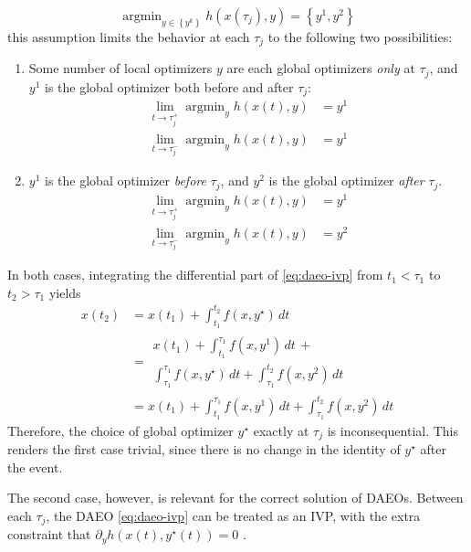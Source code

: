 \documentclass[twoside,leqno, twocolumn]{article}
\DeclareMathOperator*{\argmin}{\arg\min}
\begin{document}
\begin{equation*}
	\argmin_{y\in\left\{y^k\right\}} h(x(\tau_j), y) = \left\{y^1, y^2\right\}
\end{equation*}
this assumption limits the behavior at each $\tau_j$ to the following two possibilities:
\begin{enumerate}
	\item Some number of local optimizers $y$ are each global optimizers \textit{only} at $\tau_j$, and $y^1$ is the global optimizer both before and after $\tau_j$:
	\begin{equation*}
		\begin{aligned}
			\lim_{t\to \tau_j^+} \argmin_{y} h(x(t), y) &= y^1\\
			\lim_{t\to \tau_j^-} \argmin_{y} h(x(t), y) &= y^1
		\end{aligned}
	\end{equation*}
	\item $y^1$ is the global optimizer \textit{before} $\tau_j$, and $y^2$ is the global optimizer \textit{after} $\tau_j$.
	\begin{equation*}
		\begin{aligned}
			\lim_{t\to \tau_j^+} \argmin_{y} h(x(t), y) &= y^1\\
			\lim_{t\to \tau_j^-} \argmin_{y} h(x(t), y) &= y^2
		\end{aligned}
	\end{equation*}
\end{enumerate}
In both cases, integrating the differential part of \eqref{eq:daeo-ivp} from $t_1 < \tau_1$ to $t_2 > \tau_1$ yields
\begin{equation}
	\begin{aligned}
		x(t_2) &= x(t_1) + \int_{t_1}^{t_2}f(x, y^\star)\,dt\\
		&=\begin{split}
			x(t_1) + \int_{t_1}^{\tau_1}f(x, y^1)\,dt\,+\\
			\int_{\tau_1}^{\tau_1}f(x, y^\star)\,dt +\int_{\tau_1}^{t_2}f(x, y^2)\,dt
		\end{split}\\
		&=x(t_1) + \int_{t_1}^{\tau_1}f(x, y^1)\,dt + \int_{\tau_1}^{t_2}f(x, y^2)\,dt
	\end{aligned}
\end{equation}
Therefore, the choice of global optimizer $y^\star$ exactly at $\tau_j$ is inconsequential. This renders the first case trivial, since there is no change in the identity of $y^\star$ after the event.

The second case, however, is relevant for the correct solution of DAEOs. Between each $\tau_j$, the DAEO \eqref{eq:daeo-ivp} can be treated as an IVP, with the extra constraint that $\partial_{y} h(x(t), y^\star(t)) = 0$ \cite{deussenSubdomainSeparabilityGlobal2023}.
\end{document}
